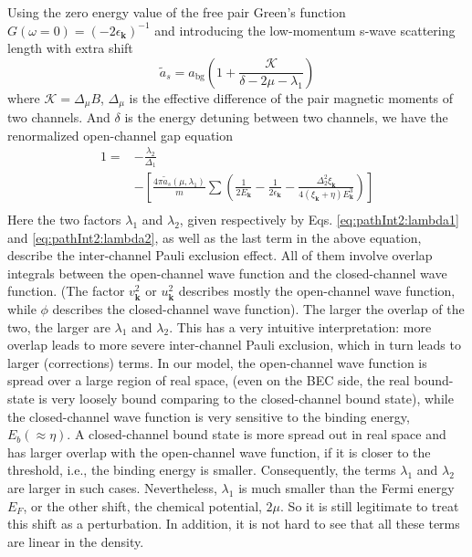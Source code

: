 \documentclass[reprint,pra]{revtex4-1}
\newcommand{\vk}{\ensuremath{\mathbf{k}}}
\newcommand{\nth}[1]{\ensuremath{\frac{1}{#1}}}
\newcommand{\mbr}[1]{\ensuremath{\left[#1\right]}}
\begin{document}
Using the zero energy value of the free pair Green's function $G(\omega=0)=(-2\epsilon_{\vk})^{-1}$ and introducing the low-momentum s-wave scattering length with extra shift 
\begin{equation}\label{eq:pathInt2:asKshift}
\tilde{a}_s=a_{\text{bg}}(1+\frac{\mathcal{K}}{\delta-2\mu-\lambda_{1}})
\end{equation}
where $\mathcal{K}=\Delta_{\mu}B$, $\Delta_{\mu}$ is the  effective difference of the pair magnetic moments of two channels. And  $\delta$ is the energy detuning between two channels, we have the renormalized open-channel gap equation
\begin{equation}
\begin{split}\label{eq:pathInt2:gapRenorm}
1=&-\frac{\lambda_{2}}{\Delta_{1}}\\
&-\mbr{\frac{4\pi{\tilde{a}_{s}(\mu,\lambda_{1})}}{m}\sum(\nth{2E_{\vk}}-\nth{2\epsilon_{\vk}}-\frac{\Delta_{2}^{2}\xi_{\vk}}{4(\xi_{\vk}+\eta){E_{\vk}^{3}}})}
	\\
\end{split}	
\end{equation}
Here the two factors $\lambda_1$ and $\lambda_2$, given respectively by Eqs. \eqref{eq:pathInt2:lambda1} and \eqref{eq:pathInt2:lambda2}, as well as the last term in the above equation, describe the inter-channel Pauli exclusion effect. All of them involve overlap integrals between the open-channel wave function and the closed-channel wave function.  (The factor $v_{\vk}^{2}$ or $u_{\vk}^{2}$ describes mostly the open-channel wave function, while $\phi$ describes the closed-channel wave function). The larger the overlap of the two, the larger are $\lambda_1$ and $\lambda_2$.  This has a very intuitive interpretation:  more overlap leads to more severe inter-channel Pauli exclusion, which in turn leads to larger (corrections) terms.  In our model, the open-channel wave function is  spread  over  a large region of  real space, (even on the BEC side, the real bound-state is very loosely bound comparing to the closed-channel bound state), while the closed-channel wave function is very sensitive to the binding energy, $E_{b}(\approx\eta)$.  A closed-channel bound state is more spread out  in real space and has larger overlap with the open-channel wave function,  if it is closer to the threshold, i.e.,  the binding energy  is smaller. Consequently,  the terms $\lambda_1$ and $\lambda_2$ are larger in such cases.                           Nevertheless, $\lambda_1$ is much smaller than the  Fermi energy $E_{F}$, or the other shift, the chemical potential, $2\mu$.  So it is still legitimate to treat this shift as a perturbation.  In addition, it is not hard to see that all these terms are linear in the density.
\end{document}
